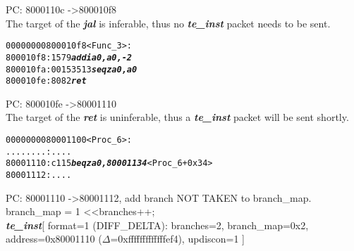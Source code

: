 \begin{enumerate}
  \begin{frame}

  PC: 8000110c -\textgreater 800010f8\\
  The target of the \textbf{\textit{jal}} is inferable, thus no \textbf{\textit{te\_inst}} packet needs to be sent.
  \end{frame}
  

\begin {alltt}
00000000800010f8 <Func\_3>:
    800010f8:	1579                    \textbf{\textit{addi	a0,a0,-2}}
    800010fa:	00153513                \textbf{\textit{seqz	a0,a0}}
    800010fe:	8082                    \textbf{\textit{ret}}
\end{alltt}

  \begin{frame}

  PC: 800010fe -\textgreater 80001110\\
  The target of the \textbf{\textit{ret}} is uninferable, thus a \textbf{\textit{te\_inst}} packet will be sent shortly.
  \end{frame}
  
\begin{alltt}
  
0000000080001100 <Proc\_6>:
    ........:   ....
    80001110:	c115                	\textbf{\textit{beqz	a0,80001134}} <Proc\_6+0x34>
    80001112:	....
\end{alltt}

  \begin{frame}

  PC: 80001110 -\textgreater 80001112, add branch NOT TAKEN to branch\_map.\\
  branch\_map \textbar= 1 \textless\textless branches++;\\
  \textbf{\textit{te\_inst}}[ format=1 (DIFF\_DELTA): branches=2, branch\_map=0x2, address=0x80001110 ($\Delta$=0xfffffffffffffef4), updiscon=1 ]
  \end{frame}
  
  
\end{enumerate}

